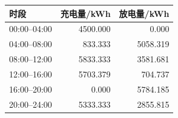 \begin{tabular}{lrr}
\toprule
时段 & 充电量/kWh & 放电量/kWh \\
\midrule
00:00--04:00 & 4500.000 & 0.000 \\
04:00--08:00 & 833.333 & 5058.319 \\
08:00--12:00 & 5833.333 & 3581.681 \\
12:00--16:00 & 5703.379 & 704.737 \\
16:00--20:00 & 0.000 & 5784.185 \\
20:00--24:00 & 5333.333 & 2855.815 \\
\bottomrule
\end{tabular}
